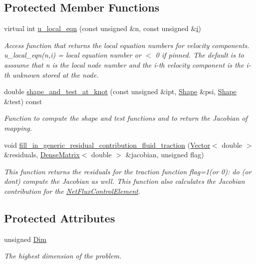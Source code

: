 \subsection*{Protected Member Functions}
\begin{DoxyCompactItemize}
\item 
virtual int \hyperlink{classoomph_1_1NavierStokesFluxControlElement_ab09c37065b0b92bf7d44973a0a6dcade}{u\+\_\+local\+\_\+eqn} (const unsigned \&n, const unsigned \&\hyperlink{cfortran_8h_adb50e893b86b3e55e751a42eab3cba82}{i})
\begin{DoxyCompactList}\small\item\em Access function that returns the local equation numbers for velocity components. u\+\_\+local\+\_\+eqn(n,i) = local equation number or $<$ 0 if pinned. The default is to asssume that n is the local node number and the i-\/th velocity component is the i-\/th unknown stored at the node. \end{DoxyCompactList}\item 
double \hyperlink{classoomph_1_1NavierStokesFluxControlElement_a4c203742bc44ab562fcb98eaa2380e3a}{shape\+\_\+and\+\_\+test\+\_\+at\+\_\+knot} (const unsigned \&ipt, \hyperlink{classoomph_1_1Shape}{Shape} \&psi, \hyperlink{classoomph_1_1Shape}{Shape} \&test) const
\begin{DoxyCompactList}\small\item\em Function to compute the shape and test functions and to return the Jacobian of mapping. \end{DoxyCompactList}\item 
void \hyperlink{classoomph_1_1NavierStokesFluxControlElement_a61f129d70845f43c8cb592a4f1258a9f}{fill\+\_\+in\+\_\+generic\+\_\+residual\+\_\+contribution\+\_\+fluid\+\_\+traction} (\hyperlink{classoomph_1_1Vector}{Vector}$<$ double $>$ \&residuals, \hyperlink{classoomph_1_1DenseMatrix}{Dense\+Matrix}$<$ double $>$ \&jacobian, unsigned flag)
\begin{DoxyCompactList}\small\item\em This function returns the residuals for the traction function flag=1(or 0)\+: do (or don\textquotesingle{}t) compute the Jacobian as well. This function also calculates the Jacobian contribution for the \hyperlink{classoomph_1_1NetFluxControlElement}{Net\+Flux\+Control\+Element}. \end{DoxyCompactList}\end{DoxyCompactItemize}
\subsection*{Protected Attributes}
\begin{DoxyCompactItemize}
\item 
unsigned \hyperlink{classoomph_1_1NavierStokesFluxControlElement_a6ae17dbe81d09caf9e65e729254474b6}{Dim}
\begin{DoxyCompactList}\small\item\em The highest dimension of the problem. \end{DoxyCompactList}\end{DoxyCompactItemize}
